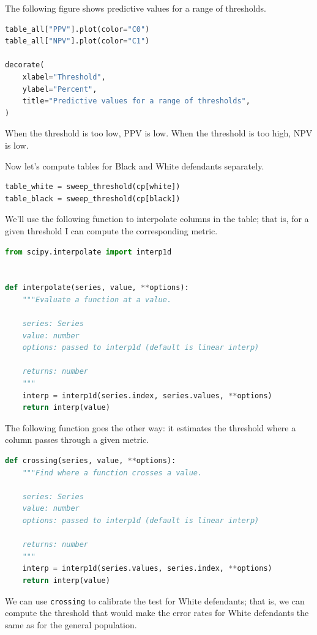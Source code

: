 The following figure shows predictive values for a range of thresholds.

\begin{lstlisting}[language=Python,style=source]
table_all["PPV"].plot(color="C0")
table_all["NPV"].plot(color="C1")

decorate(
    xlabel="Threshold",
    ylabel="Percent",
    title="Predictive values for a range of thresholds",
)
\end{lstlisting}

When the threshold is too low, PPV is low. When the threshold is too
high, NPV is low.

Now let's compute tables for Black and White defendants separately.

\begin{lstlisting}[language=Python,style=source]
table_white = sweep_threshold(cp[white])
table_black = sweep_threshold(cp[black])
\end{lstlisting}

We'll use the following function to interpolate columns in the table;
that is, for a given threshold I can compute the corresponding metric.

\begin{lstlisting}[language=Python,style=source]
from scipy.interpolate import interp1d


def interpolate(series, value, **options):
    """Evaluate a function at a value.

    series: Series
    value: number
    options: passed to interp1d (default is linear interp)

    returns: number
    """
    interp = interp1d(series.index, series.values, **options)
    return interp(value)
\end{lstlisting}

The following function goes the other way: it estimates the threshold
where a column passes through a given metric.

\begin{lstlisting}[language=Python,style=source]
def crossing(series, value, **options):
    """Find where a function crosses a value.

    series: Series
    value: number
    options: passed to interp1d (default is linear interp)

    returns: number
    """
    interp = interp1d(series.values, series.index, **options)
    return interp(value)
\end{lstlisting}

We can use \passthrough{\lstinline!crossing!} to calibrate the test for
White defendants; that is, we can compute the threshold that would make
the error rates for White defendants the same as for the general
population.

